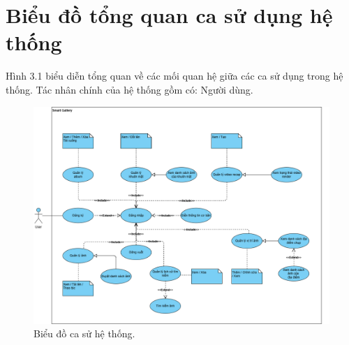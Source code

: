 \section{Biểu đồ tổng quan ca sử dụng hệ thống}
Hình 3.1 biểu diễn tổng quan về các mối quan hệ giữa các ca sử dụng trong hệ
thống. Tác nhân chính của hệ thống gồm có: Người dùng.
\begin{figure}[H]
    \centering
    \includegraphics[width=1.1\textwidth]{figures/c3/3-2-usecase-graph_2.png}
    \caption{Biểu đồ ca sử hệ thống.}
    \label{fig:3-2-usecase-graph}
\end{figure}